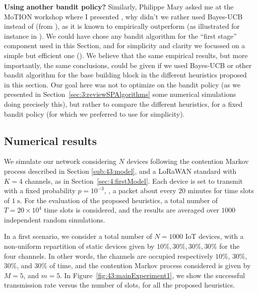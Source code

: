 \textbf{Using another bandit policy?}
%
Similarly, Philippe Mary asked me at the MoTION workshop where I presented \cite{Bonnefoi2019WCNC}, why didn't we rather used Bayes-UCB instead of \UCB{} (from \cite{Kaufmann12BUCB}), as it is known to empirically outperform \UCB{} (as illustrated for instance in \cite{darak2016bayesian,kumar2016two}).
We could have chose any bandit algorithm for the ``first stage'' component used in this Section, and for simplicity and clarity we focussed on a simple but efficient one (\UCB).
We believe that the same empirical results, but more importantly, the same conclusions, could be given if we used Bayes-UCB or other bandit algorithm for the base building block in the different heuristics proposed in this section.
Our goal here was not to optimize on the bandit policy (as we presented in Section~\ref{sec:3:reviewSPAlgorithms} some numerical simulations doing precisely this), but rather to compare the different heuristics, for a fixed bandit policy (for which we preferred to use \UCB{} for simplicity).


\subsection{Numerical results}
\label{sub:43:numExp}

We simulate our network considering $N$ devices following the contention Markov process described in Section \ref{sub:43:model}, and a LoRaWAN standard with $K=4$ channels, as in Section~\ref{sec:4:firstModel}.
Each device is set to transmit with a fixed probability $p=10^{-3}$, \ie, a packet about every $20$ minutes for time slots of $1\;\mathrm{s}$.
%
For the evaluation of the proposed heuristics, a total number of $T=20 \times 10^4$ time slots is considered, and the results are averaged over $1000$ independent random simulations.

In a first scenario, we consider a total number of $N=1000$ IoT devices, with a non-uniform repartition of static devices given by $10\%,30\%,30\%,30\%$ for the four channels.
In other words, the channels are occupied respectively $10\%$, $30\%$, $30\%$, and $30\%$ of time, and the contention Markov process considered is given by $M = 5$, and $m=5$.
In Figure~\ref{fig:43:mainExperiment1}, we show the successful transmission rate versus the number of slots, for all the proposed heuristics.

